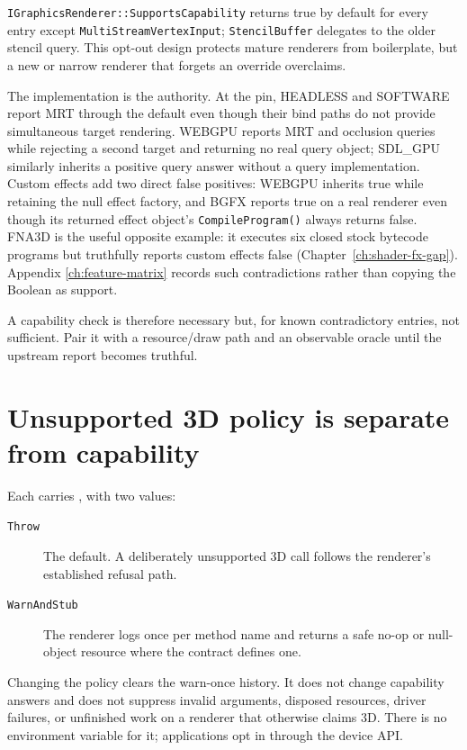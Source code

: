 \texttt{IGraphicsRenderer::SupportsCapability} returns true by default for every entry except
\texttt{MultiStreamVertexInput}; \texttt{StencilBuffer} delegates to the older stencil query.
This opt-out design protects mature renderers from boilerplate, but a new or narrow renderer that
forgets an override overclaims.

The implementation is the authority.  At the pin, HEADLESS and SOFTWARE report MRT through the
default even though their bind paths do not provide simultaneous target rendering.  WEBGPU reports
MRT and occlusion queries while rejecting a second target and returning no real query object;
SDL\_GPU similarly inherits a positive query answer without a query implementation. Custom effects
add two direct false positives: WEBGPU inherits true while retaining the null effect factory, and
BGFX reports true on a real renderer even though its returned effect object's
\texttt{CompileProgram()} always returns false. FNA3D is the useful opposite example: it executes
six closed stock bytecode programs but truthfully reports custom effects false
(Chapter~\ref{ch:shader-fx-gap}). Appendix \ref{ch:feature-matrix} records such contradictions
rather than copying the Boolean as support.

A capability check is therefore necessary but, for known contradictory entries, not sufficient.
Pair it with a resource/draw path and an observable oracle until the upstream report becomes
truthful.

\section{Unsupported 3D policy is separate from capability}

Each  carries
, with two values:

\begin{description}
  \item[\texttt{Throw}] The default.  A deliberately unsupported 3D call follows the renderer's
        established refusal path.
  \item[\texttt{WarnAndStub}] The renderer logs once per method name and returns a safe no-op or
        null-object resource where the contract defines one.
\end{description}

Changing the policy clears the warn-once history.  It does not change capability answers and does
not suppress invalid arguments, disposed resources, driver failures, or unfinished work on a
renderer that otherwise claims 3D.  There is no environment variable for it; applications opt in
through the device API.

